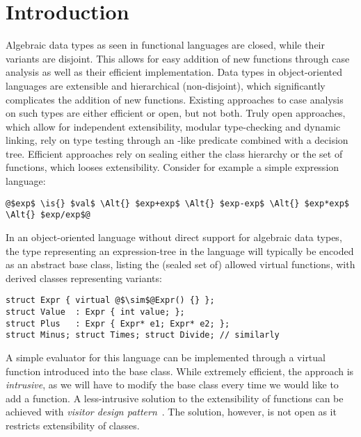 \section{Introduction} %
\label{sec:intro}


Algebraic data types as seen in functional languages are closed, while their 
variants are disjoint. This allows for easy addition of new functions through 
case analysis as well as their efficient implementation. Data types in 
object-oriented languages are extensible and hierarchical (non-disjoint), which 
significantly complicates the addition of new functions. Existing approaches to 
case analysis on such types are either efficient or open, but not both. Truly 
open approaches, which allow for independent extensibility, modular 
type-checking and dynamic linking, rely on type testing through an 
-like predicate combined with a decision tree. Efficient 
approaches rely on sealing either the class hierarchy or the set of functions, 
which looses extensibility. Consider for example a simple expression language: 

\begin{lstlisting}
@$exp$ \is{} $val$ \Alt{} $exp+exp$ \Alt{} $exp-exp$ \Alt{} $exp*exp$ \Alt{} $exp/exp$@
\end{lstlisting}

\noindent 
In an object-oriented language without direct support for algebraic data types, 
the type representing an expression-tree in the language will typically be 
encoded as an abstract base class, listing the (sealed set of) allowed virtual 
functions, with derived classes representing variants:

\begin{lstlisting}[keepspaces,columns=flexible]
struct Expr { virtual @$\sim$@Expr() {} };
struct Value  : Expr { int value; };
struct Plus   : Expr { Expr* e1; Expr* e2; };
struct Minus; struct Times; struct Divide; // similarly
\end{lstlisting}

\noindent
A simple evaluator for this language can be implemented through a virtual 
function  introduced into the base class. 
While extremely efficient, the approach is \emph{intrusive}, as we will have to 
modify the base class every time we would like to add a function. 
A less-intrusive solution to the extensibility of functions can be achieved with 
\emph{visitor design pattern}~\cite{DesignPatterns1993}. The solution, however, 
is not open as it restricts extensibility of classes.

